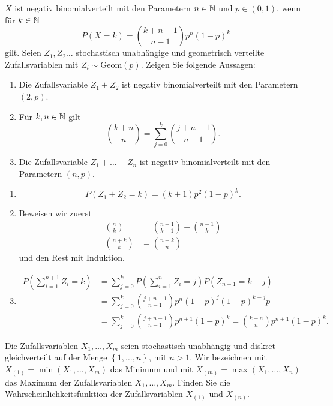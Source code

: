  $X$ ist negativ
binomialverteilt mit den Parametern $n\in\mathbb N$ und $p\in \left( 0,1 \right)$, wenn
für $k\in\mathbb N$
\begin{equation*}
    P(X = k) = \binom{k+n-1}{n-1} p^{n} (1-p)^{k} 
\end{equation*}
gilt. Seien $Z_1,Z_2\dots$ stochastisch unabhängige und geometrisch verteilte Zufallsvariablen mit 
$Z_i \sim \text{Geom}(p)$. Zeigen Sie folgende Aussagen: 
\begin{enumerate}
    \item Die Zufallsvariable $Z_1+Z_2$ ist negativ binomialverteilt mit den
        Parametern $(2,p)$. 
    \item Für $k, n \in\mathbb N$ gilt
        \begin{equation*}
            \binom{k+n}{n} = \sum_{j=0}^{k} \binom{j+n-1}{n-1}.
        \end{equation*}
    \item Die Zufallsvariable $Z_1+\dots+Z_n$ ist negativ binomialverteilt mit den
        Parametern $(n,p)$. 
\end{enumerate}

\solution
\begin{enumerate}
    \item \begin{equation*}
            P\left( Z_1+Z_2 = k \right) = (k+1)p^{2}(1-p)^k.
        \end{equation*}
    \item Beweisen wir zuerst
        \begin{align*}
            \binom{n}{k} &= \binom{n-1}{k-1} + \binom{n-1}{k} \\
            \binom{n+k}{k} &= \binom{n+k}{n}
        \end{align*}
        und den Rest mit Induktion.
    \item \begin{align*}
            P\left( \sum_{i=1}^{n+1} Z_i = k \right) &= 
            \sum_{j=0}^{k} P\left( \sum_{i=1}^{n} Z_i = j \right) P\left( Z_{n+1} =k-j \right) \\
            &= \sum_{j=0}^{k} \binom{j+n-1}{n-1} p^{n}(1-p)^{j} (1-p)^{k-j}p \\
            &= \sum_{j=0}^{k} \binom{j+n-1}{n-1} p^{n+1}(1-p)^{k} = \binom{k+n}{n} p^{n+1}(1-p)^{k}. 
        \end{align*}
\end{enumerate}


 Die Zufallsvariablen
$X_1,\dots ,X_m$ seien stochastisch unabhängig und diskret gleichverteilt auf der Menge
$\left\{ 1,\dots ,n \right\}$, mit $n>1$. Wir bezeichnen mit $X_{(1)} = \min
(X_1,\dots ,X_m)$ das Minimum und mit $X_{(m)} = \max \left( X_1,\dots ,X_n
\right)$ das Maximum der Zufallsvariablen $X_1,\dots ,X_m$.
Finden Sie die Wahrscheinlichkeitsfunktion der Zufallsvariablen
        $X_{(1)}$ und $X_{(n)}$.

